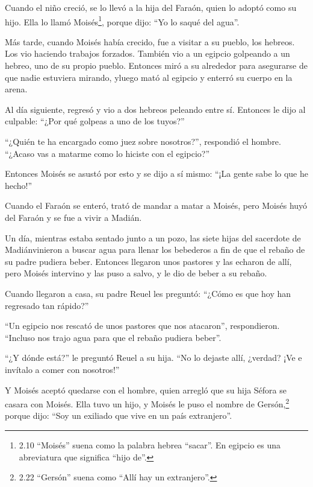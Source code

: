  Cuando el niño creció, se lo llevó a la hija del Faraón,
quien lo adoptó como su hijo. Ella lo llamó Moisés\footnote{2.10
  ``Moisés'' suena como la palabra hebrea ``sacar''. En egipcio es una
  abreviatura que significa ``hijo de''.}, porque dijo: ``Yo lo saqué
del agua''.

 Más tarde, cuando Moisés había crecido, fue a visitar a su
pueblo, los hebreos. Los vio haciendo trabajos forzados. También vio a
un egipcio golpeando a un hebreo, uno de su propio pueblo. 
Entonces miró a su alrededor para asegurarse de que nadie estuviera
mirando, yluego mató al egipcio y enterró su cuerpo en la arena.

 Al día siguiente, regresó y vio a dos hebreos peleando
entre sí. Entonces le dijo al culpable: ``¿Por qué golpeas a uno de los
tuyos?''

 ``¿Quién te ha encargado como juez sobre nosotros?'',
respondió el hombre. ``¿Acaso vas a matarme como lo hiciste con el
egipcio?''

Entonces Moisés se asustó por esto y se dijo a sí mismo: ``¡La gente
sabe lo que he hecho!''

 Cuando el Faraón se enteró, trató de mandar a matar a
Moisés, pero Moisés huyó del Faraón y se fue a vivir a Madián.

Un día, mientras estaba sentado junto a un pozo,  las siete
hijas del sacerdote de Madiánvinieron a buscar agua para llenar los
bebederos a fin de que el rebaño de su padre pudiera beber.
 Entonces llegaron unos pastores y las echaron de allí,
pero Moisés intervino y las puso a salvo, y le dio de beber a su rebaño.

 Cuando llegaron a casa, su padre Reuel les preguntó:
``¿Cómo es que hoy han regresado tan rápido?''

 ``Un egipcio nos rescató de unos pastores que nos
atacaron'', respondieron. ``Incluso nos trajo agua para que el rebaño
pudiera beber''.

 ``¿Y dónde está?'' le preguntó Reuel a su hija. ``No lo
dejaste allí, ¿verdad? ¡Ve e invítalo a comer con nosotros!''

 Y Moisés aceptó quedarse con el hombre, quien arregló que
su hija Séfora se casara con Moisés.  Ella tuvo un hijo, y
Moisés le puso el nombre de Gersón,\footnote{2.22 ``Gersón'' suena como
  ``Allí hay un extranjero''.} porque dijo: ``Soy un exiliado que vive
en un país extranjero''.

